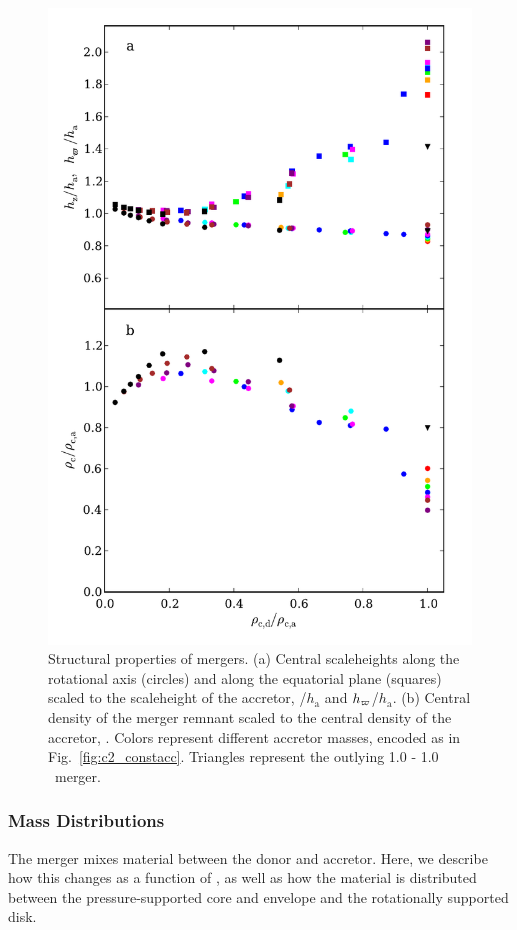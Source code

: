 

\begin{figure}
\centering
\includegraphics[angle=0,width=0.6\columnwidth]{chapter2_zhu+13/figures/StructureTrendsq.pdf}
\caption{Structural properties of mergers.  (a) Central scaleheights along the rotational axis (circles) and along the equatorial plane (squares) scaled to the scaleheight of the accretor, {\hz}/$h_\mathrm{a}$ and $\hxy$/$h_\mathrm{a}$.  (b) Central density of the merger remnant scaled to the central density of the accretor, {\rhocrhoct}.  Colors represent different accretor masses, encoded as in Fig.~\ref{fig:c2_constacc}.  Triangles represent the outlying 1.0 - 1.0\,\Msun\ merger.}
\label{fig:c2_structuretrends}
\end{figure}

\subsubsection{Mass Distributions}
\label{sssec:c2_masstrends}

The merger mixes material between the donor and accretor.  Here, we describe how this changes as a function of \qrho, as well as how the material is distributed between the pressure-supported core and envelope and the rotationally supported disk.

